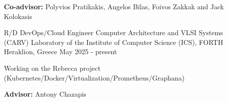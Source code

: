 \begin{cventries}
{\begin{cvitems}
        \item{\textbf{Co-advisor:} Polyvios Pratikakis, Angelos Bilas, Foivos Zakkak and Jack Kolokasis}
      \end{cvitems}
    }
  \cventry
    {R/D DevOps/Cloud Engineer} %
    {Computer Architecture and VLSI Systems (CARV) Laboratory of the Institute of Computer Science (ICS), FORTH} %
    {Heraklion, Greece} %
    {May 2025 - present} %
    {
      \begin{cvitems} %
      \item {Working on the Rebecca project (Kubernetes/Docker/Virtualization/Prometheus/Graphana)}
        \item{\textbf{Advisor:} Antony Chazapis}
      \end{cvitems}
    }
\end{cventries}
